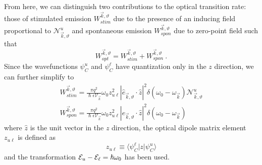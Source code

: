 \documentclass[12pt]{report}
\begin{document}
{\begin{equation}
\end{equation}
From here, we can distinguish two contributions to the optical transition rate: those of stimulated emission $W_{stim}^{\vec{k},\vartheta}$ due to the presence of an inducing field proportional to $\mathcal{N}_{\vec{k},\vartheta}^u$ and spontaneous emission $W_{spon}^{\vec{k},\vartheta}$ due to zero-point field such that
\begin{equation}
W_{opt}^{\vec{k},\vartheta} = W_{stim}^{\vec{k},\vartheta}+W_{spon}^{\vec{k},\vartheta} {~.}
\end{equation}
Since the wavefunctions $\psi_C^u$ and $\psi_C^\ell$ have quantization only in the $z$ direction, we can further simplify to
\begin{subequations}
\begin{gather}
W_{stim}^{\vec{k},\vartheta} = \frac{\pi q^2}{\hslash \epsilon \mathcal{V}_{\vec{k}}} \omega_{0}
z_{u\ell}^2
|\hat{e}_{\vec{k},\vartheta} \cdot \hat{z} |^2  %
\delta(\omega_0-\omega_{\vec{k}}) \mathcal{N}_{\vec{k},\vartheta}^u\\
W_{spon}^{\vec{k},\vartheta} = \frac{\pi q^2}{\hslash \epsilon \mathcal{V}_{\vec{k}}} \omega_{0}
z_{u\ell}^2
|\hat{e}_{\vec{k},\vartheta} \cdot \hat{z} |^2  %
\delta(\omega_0-\omega_{\vec{k}})
\label{chpt1eqn:WsponMode1}
\end{gather}
\end{subequations}
where $\hat{z}$ is the unit vector in the $z$ direction, the optical dipole matrix element $z_{u\ell}$ is defined as
\begin{equation}
z_{u\ell}\equiv\langle \psi_C^\ell \vert z \vert \psi_C^u\rangle
\end{equation}
and the transformation $\EE_u-\EE_\ell=\hslash \omega_0$ has been used.

}
\end{document}
